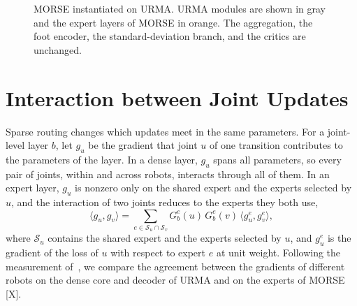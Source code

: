 \begin{figure}[t]
\centering
\fbox{\rule{0pt}{1.3in}\rule{0.95\linewidth}{0pt}}
\caption{MORSE instantiated on URMA. URMA modules are shown in gray and the expert layers of MORSE in orange. The
aggregation, the foot encoder, the standard-deviation branch, and the critics are unchanged.}
\label{fig:urma}
\end{figure}

\section{Interaction between Joint Updates}
\label{supp:interaction}

Sparse routing changes which updates meet in the same parameters. For a joint-level layer $b$, let $g_u$ be the
gradient that joint $u$ of one transition contributes to the parameters of the layer. In a dense layer, $g_u$ spans
all parameters, so every pair of joints, within and across robots, interacts through all of them. In an expert layer,
$g_u$ is nonzero only on the shared expert and the experts selected by $u$, and the interaction of two joints reduces
to the experts they both use,
\begin{equation}
\bigl\langle g_u,g_v\bigr\rangle=\sum_{e\in\mathcal{S}_u\cap\mathcal{S}_v}G^e_b(u)\,G^e_b(v)\,
\bigl\langle g^e_u,g^e_v\bigr\rangle,
\label{eq:localized}
\end{equation}
where $\mathcal{S}_u$ contains the shared expert and the experts selected by $u$, and $g^e_u$ is the gradient of the
loss of $u$ with respect to expert $e$ at unit weight. Following the measurement
of~\citet{abe2026crossembodimentoffline}, we compare the agreement between the gradients of different robots on the
dense core and decoder of URMA and on the experts of MORSE [X].
